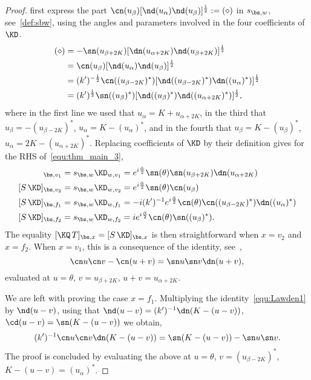 \documentclass[a4paper,twoside,11pt]{article}
\begin{document}
\begin{proof}
first express the part $\cn(u_\beta)[\nd(u_\alpha)\nd(u_\beta)]^{\frac{1}{2}}:=(\diamond)$
in $s_{\bs,w}$, see~\eqref{def:sbw}, using the angles and parameters involved in the four coefficients of $\KD$.
\begin{align*}
(\diamond)&=-\sn(u_{\beta+2K})[\dn(u_{\alpha+2K})\nd(u_{\beta+2K})]^{\frac{1}{2}}\\
&=\cn(u_\beta)[\nd(u_\alpha)\nd(u_\beta)]^{\frac{1}{2}}\\
&=(k')^{-\frac{1}{2}}\cn((u_{\beta-2K})^*)[\nd((u_{\beta-2K})^*)\dn((u_\alpha)^*)]^{\frac{1}{2}}\\
&=(k')^{\frac{1}{2}}\sn((u_{\beta})^*)[\nd((u_\beta)^*)\nd((u_{\alpha+2K})^*)]^{\frac{1}{2}},
\end{align*}
where in the first line we used that $u_{\alpha}=K+u_{\alpha+2K}$, in the third that
$u_\beta=-(u_{\beta-2K})^*$, $u_{\alpha}=K-(u_\alpha)^*$, and in the fourth that
$u_\beta=K-(u_{\beta})^*$, $u_{\alpha}=2K-(u_{\alpha+2K})^{*}$. 
Replacing coefficients of $\KD$ by their definition gives for the RHS 
of~\eqref{equ:thm_main_3},
\begin{align*}
[S\, \KD]_{\bs,v_1}&=s_{\bs,w}\KD_{w,v_1}=e^{i\frac{\bar{\alpha}}{2}} \sn(\theta)\sn(u_{\beta+2K})\dn(u_{\alpha+2K})\\
[S\, \KD]_{\bs,v_2}&=s_{\bs,w}\KD_{w,v_2}=e^{i\frac{\bar{\alpha}}{2}} \sn(\theta)\cn(u_\beta)\\
[S\, \KD]_{\bs,f_1}&=s_{\bs,w}\KD_{w,f_1}=-i(k')^{-1}e^{i\frac{\bar{\alpha}}{2}}\cn(\theta)\cn((u_{\beta-2K})^*)\dn((u_\alpha)^*)\\
[S\, \KD]_{\bs,f_2}&=s_{\bs,w}\KD_{w,f_2}=ie^{i\frac{\bar{\alpha}}{2}}\cn(\theta)\sn((u_{\beta})^*).
\end{align*}
The equality $[\KQ\,T]_{\bs,x}=[S\, \KD]_{\bs,x}$ is then straightforward when $x=v_2$ and $x=f_2$.
When $x=v_1$, this is a consequence of the identity, see~\cite[chap.2, ex.32 (i)]{Lawden},
\begin{equation}\label{equ:Lawden1}
\cn u\cn v-\cn(u+v)=\sn u\sn v\dn(u+v),
\end{equation}
evaluated at $u=\theta,\,v=u_{\beta+2K},\,u+v=u_{\alpha+2K}$.

We are left with proving the case $x=f_1$. Multiplying the identity~\eqref{equ:Lawden1} by $\nd(u-v)$, using that
$\nd(u-v)=(k')^{-1}\dn(K-(u-v))$, $\cd(u-v)=\sn(K-(u-v))$ we obtain,
\[
(k')^{-1}\cn u\cn v\dn(K-(u-v))=\sn(K-(u-v))-\sn u \sn v.
\]
The proof is concluded by evaluating the above at $u=\theta$, $v=(u_{\beta-2K})^*$, $K-(u-v)=(u_{\alpha})^*$.


\end{proof}
\end{document}
